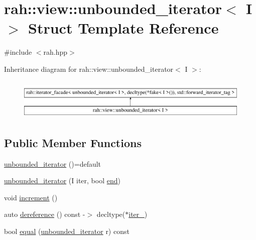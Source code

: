 \hypertarget{structrah_1_1view_1_1unbounded__iterator}{}\section{rah\+::view\+::unbounded\+\_\+iterator$<$ I $>$ Struct Template Reference}
\label{structrah_1_1view_1_1unbounded__iterator}


{\ttfamily \#include $<$rah.\+hpp$>$}

Inheritance diagram for rah\+::view\+::unbounded\+\_\+iterator$<$ I $>$\+:\begin{figure}[H]
\begin{center}
\leavevmode
\includegraphics[height=1.968366cm]{structrah_1_1view_1_1unbounded__iterator}
\end{center}
\end{figure}
\subsection*{Public Member Functions}
\begin{DoxyCompactItemize}
\item 
\mbox{\hyperlink{structrah_1_1view_1_1unbounded__iterator_aecc43db612ed5ad8e6002356feb92b48}{unbounded\+\_\+iterator}} ()=default
\item 
\mbox{\hyperlink{structrah_1_1view_1_1unbounded__iterator_a6043d431a0b2db6691397dd8029287b4}{unbounded\+\_\+iterator}} (I iter, bool \mbox{\hyperlink{namespacerah_ac309d041d5f4110ecf2d1b44f4282275}{end}})
\item 
void \mbox{\hyperlink{structrah_1_1view_1_1unbounded__iterator_a903c96112b62831505ba8c7af80f6263}{increment}} ()
\item 
auto \mbox{\hyperlink{structrah_1_1view_1_1unbounded__iterator_a99189d6052f625642f8e00ff6e58a860}{dereference}} () const -\/$>$ decltype($\ast$\mbox{\hyperlink{structrah_1_1view_1_1unbounded__iterator_a50affaae71d4122b92014b11763f6672}{iter\+\_\+}})
\item 
bool \mbox{\hyperlink{structrah_1_1view_1_1unbounded__iterator_ae9234860041ae72e3b2667d8121fa224}{equal}} (\mbox{\hyperlink{structrah_1_1view_1_1unbounded__iterator}{unbounded\+\_\+iterator}} r) const
\end{DoxyCompactItemize}
